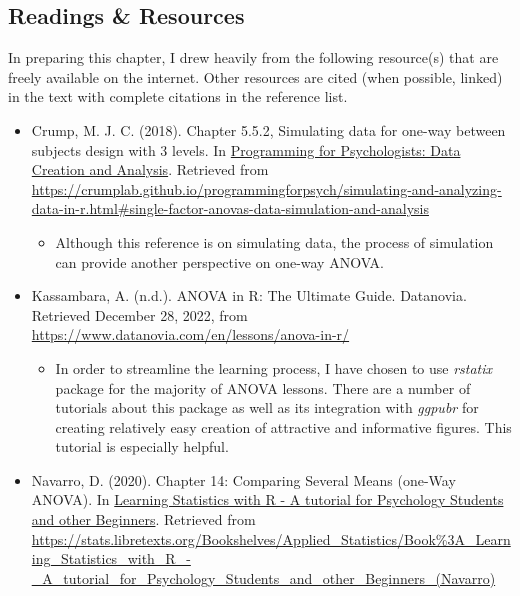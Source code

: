 \documentclass[
  11pt,
]{book}
\providecommand{\tightlist}{%
  \setlength{\itemsep}{0pt}\setlength{\parskip}{0pt}}
\begin{document}
\hypertarget{readings-resources-4}{%
\subsection{Readings \& Resources}\label{readings-resources-4}}

In preparing this chapter, I drew heavily from the following resource(s) that are freely available on the internet. Other resources are cited (when possible, linked) in the text with complete citations in the reference list.

\begin{itemize}
\tightlist
\item
  Crump, M. J. C. (2018). Chapter 5.5.2, Simulating data for one-way between subjects design with 3 levels. In \href{https://crumplab.github.io/programmingforpsych/simulating-and-analyzing-data-in-r.html\#single-factor-anovas-data-simulation-and-analysis}{Programming for Psychologists: Data Creation and Analysis}. Retrieved from \url{https://crumplab.github.io/programmingforpsych/simulating-and-analyzing-data-in-r.html\#single-factor-anovas-data-simulation-and-analysis}

  \begin{itemize}
  \tightlist
  \item
    Although this reference is on simulating data, the process of simulation can provide another perspective on one-way ANOVA.
  \end{itemize}
\item
  Kassambara, A. (n.d.). ANOVA in R: The Ultimate Guide. Datanovia. Retrieved December 28, 2022, from \url{https://www.datanovia.com/en/lessons/anova-in-r/}

  \begin{itemize}
  \tightlist
  \item
    In order to streamline the learning process, I have chosen to use \emph{rstatix} package for the majority of ANOVA lessons. There are a number of tutorials about this package as well as its integration with \emph{ggpubr} for creating relatively easy creation of attractive and informative figures. This tutorial is especially helpful.
  \end{itemize}
\item
  Navarro, D. (2020). Chapter 14: Comparing Several Means (one-Way ANOVA). In \href{https://learningstatisticswithr.com/}{Learning Statistics with R - A tutorial for Psychology Students and other Beginners}. Retrieved from \url{https://stats.libretexts.org/Bookshelves/Applied_Statistics/Book\%3A_Learning_Statistics_with_R_-_A_tutorial_for_Psychology_Students_and_other_Beginners_(Navarro)}


\end{itemize}
\end{document}
